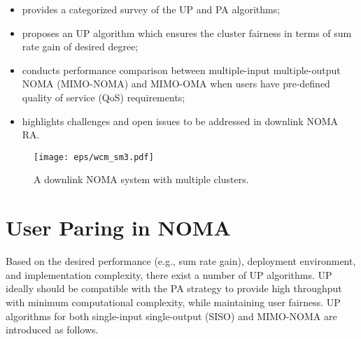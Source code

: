 \documentclass[10pt,final,journal,a4paper,twoside,twocolumn,romanappendices]{IEEEtran}
\theoremstyle{myremark}
\theoremstyle{myremark}
\begin{document}
\begin{itemize}
\item provides a categorized survey of the UP {\color{black}and PA} algorithms;

\item proposes an UP algorithm which ensures the cluster fairness in terms of sum rate gain of desired degree;

\item {\color{black}conducts performance comparison between multiple-input multiple-output NOMA (MIMO-NOMA) and MIMO-OMA when users have pre-defined quality of service (QoS) requirements;}

\item highlights challenges and open issues to be addressed in downlink NOMA RA.
\end{itemize}

\begin{figure}
\centering
\texttt{[image: eps/wcm\_sm3.pdf]}
\caption{A downlink NOMA system with multiple clusters.}
\end{figure} 

\section{User Paring in NOMA}
Based on the desired performance (e.g., sum rate gain), deployment environment, and {\color{black}implementation complexity}, there exist a number of UP algorithms. UP ideally should be compatible with the   PA strategy to provide high throughput with minimum computational complexity, while maintaining user fairness. UP algorithms for both single-input single-output (SISO) and MIMO-NOMA are introduced as follows. 
\end{document}
